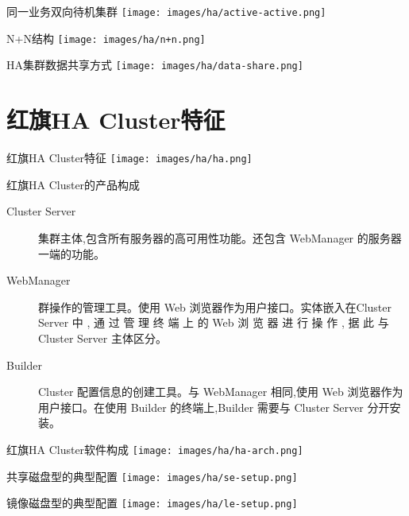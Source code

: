 \documentclass[compress,trans]{beamer} %
\begin{document}
\begin{frame}{同一业务双向待机集群}
\texttt{[image: images/ha/active-active.png]}
\end{frame}

\begin{frame}{N+N结构}
\texttt{[image: images/ha/n+n.png]}
\end{frame}

\begin{frame}{HA集群数据共享方式}
\texttt{[image: images/ha/data-share.png]}
\end{frame}

\section{红旗HA Cluster特征}
\begin{frame}{红旗HA Cluster特征}
\texttt{[image: images/ha/ha.png]}
\end{frame}

\begin{frame}{红旗HA Cluster的产品构成}
\begin{description} 
\item[Cluster Server] 
        集群主体,包含所有服务器的高可用性功能。还包含 WebManager 的服务器一端的功能。
\item[WebManager] 
 	群操作的管理工具。使用 Web 浏览器作为用户接口。实体嵌入在Cluster Server 中 , 通 过 管 理 终
端 上 的 Web 浏 览 器 进 行 操 作 , 据 此 与 Cluster Server 主体区分。
\item[Builder]   
	Cluster 配置信息的创建工具。与 WebManager 相同,使用 Web 浏览器作为用户接口。在使用 Builder 的终端上,Builder
需要与 Cluster Server 分开安 装。
\end{description}
\end{frame}

\begin{frame}{红旗HA Cluster软件构成}
\texttt{[image: images/ha/ha-arch.png]}
\end{frame}

\begin{frame}{共享磁盘型的典型配置}
\texttt{[image: images/ha/se-setup.png]}
\end{frame}

\begin{frame}{镜像磁盘型的典型配置}
\texttt{[image: images/ha/le-setup.png]}
\end{frame}
\end{document}
